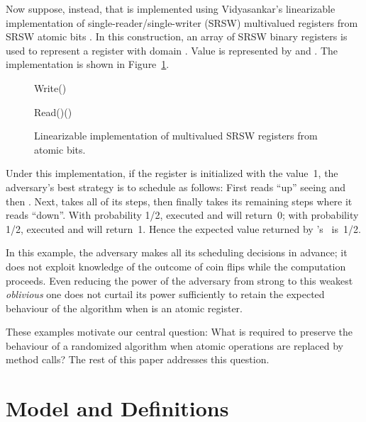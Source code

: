 \documentclass[11pt,letterpaper]{article}
\newcommand{\IlIf}[2]{\KwSty{if} #1 \KwSty{then} #2}
\newcommand{\IlRepeat}[2]{\KwSty{repeat} #2 \KwSty{until} #1}
\begin{document}
Now suppose, instead, that  is implemented
using Vidyasankar's linearizable implementation of
single-reader/single-writer (SRSW) multivalued registers from
SRSW atomic bits \cite{vid:registers}.
In this construction, an array  of
SRSW binary registers is used to represent a register with domain
.
Value  is represented by  and .
The implementation is shown in Figure~\ref{fig:multivalued_registers}.


\begin{figure} \begin{minipage}[t]{.4\textwidth}
\begin{function}[H]
  \;
  \For{}{
    \;
  }
  \caption{Write()}
\end{function}
\end{minipage}\hfill
\begin{minipage}[t]{.5\textwidth}
\begin{function}[H]
  \;
  \IlRepeat{}{}\;
  \;
  \For{}{
    \IlIf{}{}
  }
  \Return{}
  \caption{Read()()}
\end{function}
\end{minipage}
\caption{Linearizable implementation of multivalued SRSW registers from atomic bits.}
\label{fig:multivalued_registers}
\end{figure}

Under this implementation, if the register is initialized with the value~1,
the adversary's best strategy is to schedule as follows:
First  reads ``up'' seeing   and then .
Next,  takes all of its steps, then finally  takes its remaining steps where it reads ``down''.
With probability 1/2,  executed  and  will return~0;
with probability 1/2,  executed  and  will return~1.
Hence the expected value returned by 's \Read\ is~1/2.

In this example, the adversary makes all its scheduling decisions in advance;
it does not exploit knowledge of the outcome of coin flips while the computation proceeds.
Even reducing the power of the adversary from strong to this weakest \emph{oblivious} one
does not curtail its power sufficiently to retain the expected behaviour of the algorithm
when  is an atomic register.

These examples motivate our central question:
What is required to preserve the behaviour of a randomized algorithm
when atomic operations are replaced by method calls?
The rest of this paper addresses this question.



\section{Model and Definitions}
\label{model.sec}
\end{document}
